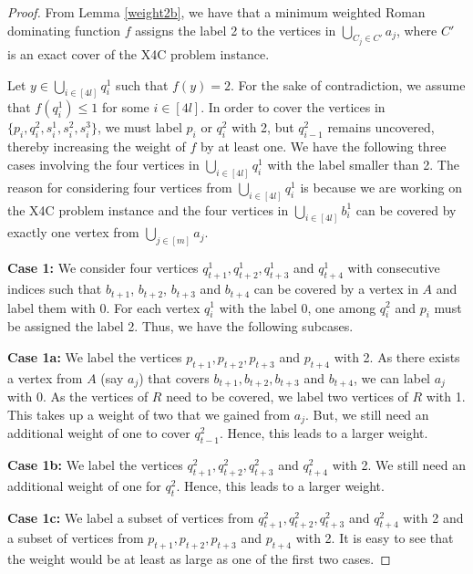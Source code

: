 \documentclass[preprint,12pt]{elsarticle}
\begin{document}
\begin{proof}
    From Lemma \ref{weight2b}, we have that a minimum weighted Roman dominating function $f$ assigns the label 2 to the vertices in $\bigcup\limits_{C_j \in C'} a_j$, where $C'$ is an exact cover of the X4C problem instance. 
    
    Let $y \in \bigcup\limits_{i \in [4l]} q_i^1$ such that $f(y) = 2$. For the sake of contradiction, we assume that $f(q_i^1) \leq 1$ for some $i \in [4l]$. In order to cover the vertices in $\{p_i,q_i^2, s_i^1, s_i^2, s_i^3\}$, we must label $p_i$ or $q_i^2$ with 2, but $q_{i-1}^2$ remains uncovered, thereby increasing the weight of $f$ by at least one. We have the following three cases involving the four vertices in $\bigcup\limits_{i \in [4l]} q_i^1$ with the label smaller than 2. The reason for considering four vertices from $\bigcup\limits_{i \in [4l]} q_i^1$ is because we are working on the X4C problem instance and the four vertices in $\bigcup\limits_{i \in [4l]} b_i^1$ can be covered by exactly one vertex from $\bigcup\limits_{j \in [m]} a_j$.
    
    \medskip\noindent
    \textbf{Case 1: }We consider four vertices $q_{t+1}^1,q_{t+2}^1,q_{t+3}^1$ and $q_{t+4}^1$ with consecutive indices such that $b_{t+1}$, $b_{t+2}$, $b_{t+3}$ and $b_{t+4}$ can be covered by a vertex in $A$ and label them with 0. For each vertex $q_i^1$ with the label 0, one among $q_i^2$ and $p_i$ must be assigned the label 2. Thus, we have the following subcases.

    \medskip\noindent
    \textbf{Case 1a:} We label the vertices $p_{t+1},p_{t+2},p_{t+3}$ and $p_{t+4}$ with 2. As there exists a vertex from $A$ (say $a_j$) that covers $b_{t+1},b_{t+2},b_{t+3}$ and $b_{t+4}$, we can label $a_j$ with 0. As the vertices of $R$ need to be covered, we label two vertices of $R$ with 1. This takes up a weight of two that we gained from $a_j$. But, we still need an additional weight of one to cover $q_{t-1}^2$. Hence, this leads to a larger weight.

    \medskip\noindent
    \textbf{Case 1b:} We label the vertices $q_{t+1}^2,q_{t+2}^2,q_{t+3}^2$ and $q_{t+4}^2$ with 2. We still need an additional weight of one for $q_{t}^2$. Hence, this leads to a larger weight.

    \medskip\noindent
    \textbf{Case 1c:} We label a subset of vertices from $q_{t+1}^2,q_{t+2}^2,q_{t+3}^2$ and $q_{t+4}^2$ with 2 and a subset of vertices from $p_{t+1},p_{t+2},p_{t+3}$ and $p_{t+4}$ with 2. It is easy to see that the weight would be at least as large as one of the first two cases.    


\end{proof}
\end{document}
